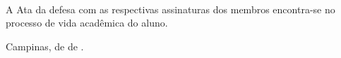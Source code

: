 {\begin{emptyenv}
\begin{center}
\begin{flushleft}
            \vspace{0.6cm}
            \hrulefill\\
            \textbf{\Wexamt\\ \Wexamtinst }\\
            
            \vspace{0.6cm}
            A Ata da defesa com as respectivas assinaturas dos membros encontra-se no processo de vida acadêmica do aluno.
        \end{flushleft}
        \begin{flushright}
            \vspace{1.2cm}
            Campinas, \Wdegreeday de \Wdegreemonth de \Wdegreeyear.
    \end{flushright}
    \end{center}
\end{emptyenv}
}

\newcommand{\maketablecontents}{
\begin{listsenv}
    \tableofcontents
\end{listsenv}
}

\newcommand{\makelistfigures}{
\begin{listsenv}
    \listoffigures
\end{listsenv}
\thispagestyle{empty}
}

\newcommand{\makelistables}{
\begin{listsenv}
    \listoftables
\end{listsenv}
\thispagestyle{empty}
}

\newcommand{\makenomenclature}{
  \begin{listsenv}
    \ifenglish
      \section*{List of Symbols}
    \else
      \section*{List of Símbolos}
    \fi
    \vspace{-2em}
    \glsaddall
    \printglossary[type=symbol,style=supergroup]
  \end{listsenv}

  \begin{listsenv}
    \ifenglish
      \section*{List of Acronyms}
    \else
      \section*{Lista de Abreviaturas e Siglas}
    \fi
    \vspace{-2em}
    \glsaddall
    \printglossary[type=acronym]
  \end{listsenv}
}

